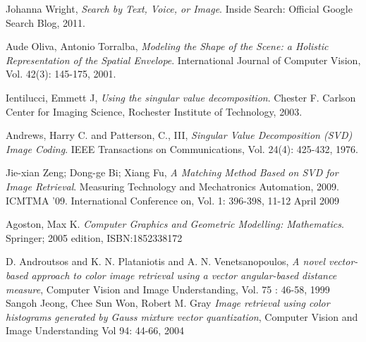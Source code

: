 \documentclass{report}
\begin{document}
\begin{thebibliography}{6}

  Johanna Wright,
  \emph{Search by Text, Voice, or Image}.
  Inside Search: Official Google Search Blog,
  2011.
  
  Aude Oliva, Antonio Torralba,
  \emph{	Modeling the Shape of the Scene: a Holistic Representation of the Spatial Envelope}.
  International Journal of Computer Vision, 
  Vol. 42(3): 145-175, 
  2001.

  Ientilucci, Emmett J,
  \emph{Using the singular value decomposition}. 
  Chester F. Carlson Center for Imaging Science,
  Rochester Institute of Technology,
  2003.

  Andrews, Harry C. and Patterson, C., III,
  \emph{ Singular Value Decomposition (SVD) Image Coding}.
  IEEE Transactions on Communications,
  Vol. 24(4): 425-432,
  1976.

  Jie-xian Zeng; Dong-ge Bi; Xiang Fu,
  \emph{A Matching Method Based on SVD for Image Retrieval}.
  Measuring Technology and Mechatronics Automation, 2009. ICMTMA '09. International Conference on, 
  Vol. 1: 396-398, 
  11-12 April 2009
  
  Agoston, Max K.
  \emph{Computer Graphics and Geometric Modelling: Mathematics}.
  Springer; 2005 edition,
  ISBN:1852338172
  
    D. Androutsos and K. N. Plataniotis and A. N. Venetsanopoulos,
    \emph{A novel vector-based approach to color image retrieval using a vector angular-based distance measure},
    Computer Vision and Image Understanding,
    Vol. 75 : 46-58,
    1999
	Sangoh Jeong, Chee Sun Won, Robert M. Gray
	\emph{Image retrieval using color histograms generated by Gauss mixture vector quantization},
	Computer Vision and Image Understanding 
	Vol 94: 44-66,
	2004

\end{thebibliography}
\end{document}
